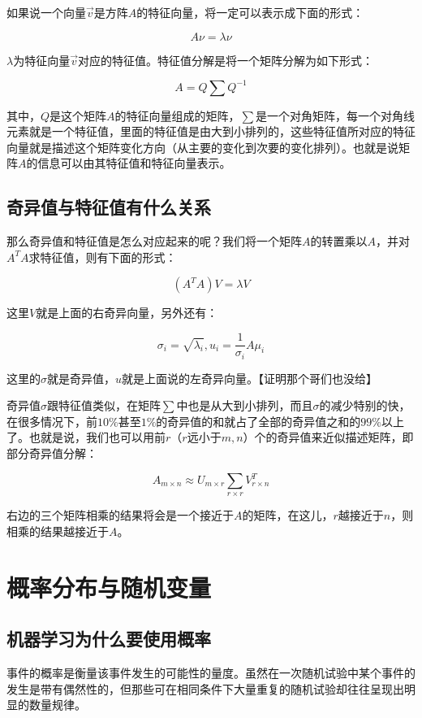 如果说一个向量$\vec{v}$是方阵$A$的特征向量，将一定可以表示成下面的形式：

$$
A\nu = \lambda \nu
$$

$\lambda$为特征向量$\vec{v}$对应的特征值。特征值分解是将一个矩阵分解为如下形式： 

$$
A=Q\sum Q^{-1}
$$

其中，$Q$是这个矩阵$A$的特征向量组成的矩阵，$\sum$是一个对角矩阵，每一个对角线元素就是一个特征值，里面的特征值是由大到小排列的，这些特征值所对应的特征向量就是描述这个矩阵变化方向（从主要的变化到次要的变化排列）。也就是说矩阵$A$的信息可以由其特征值和特征向量表示。

\subsection{奇异值与特征值有什么关系}
那么奇异值和特征值是怎么对应起来的呢？我们将一个矩阵$A$的转置乘以$A$，并对$A^TA$求特征值，则有下面的形式：

$$
(A^TA)V = \lambda V
$$

这里$V$就是上面的右奇异向量，另外还有：

$$
\sigma_i = \sqrt{\lambda_i}, u_i=\frac{1}{\sigma_i}A\mu_i
$$

这里的$\sigma$就是奇异值，$u$就是上面说的左奇异向量。【证明那个哥们也没给】

奇异值$\sigma$跟特征值类似，在矩阵$\sum$中也是从大到小排列，而且$\sigma$的减少特别的快，在很多情况下，前$10\%$甚至$1\%$的奇异值的和就占了全部的奇异值之和的$99\%$以上了。也就是说，我们也可以用前$r$（$r$远小于$m,n$）个的奇异值来近似描述矩阵，即部分奇异值分解：

$$
A_{m\times n}\approx U_{m \times r}\sum_{r\times r}V_{r \times n}^T
$$

右边的三个矩阵相乘的结果将会是一个接近于$A$的矩阵，在这儿，$r$越接近于$n$，则相乘的结果越接近于$A$。

\section{概率分布与随机变量}

\subsection{机器学习为什么要使用概率}


事件的概率是衡量该事件发生的可能性的量度。虽然在一次随机试验中某个事件的发生是带有偶然性的，但那些可在相同条件下大量重复的随机试验却往往呈现出明显的数量规律。  


